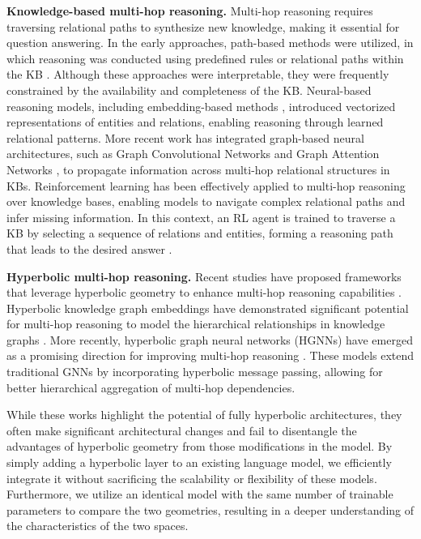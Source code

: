 \documentclass[11pt]{article}
\begin{document}
\textbf{Knowledge-based multi-hop reasoning.} Multi-hop reasoning requires traversing relational paths to synthesize new knowledge, making it essential for question answering. In the early approaches, path-based methods were utilized, in which reasoning was conducted using predefined rules or relational paths within the KB \cite{lao-etal-2011-random}.
Although these approaches were interpretable, they were frequently constrained by the availability and completeness of the KB. Neural-based reasoning models, including embedding-based methods \cite{bordes2013transe, wang2014knowledge, yang2015embedding, sunrotate}, introduced vectorized representations of entities and relations, enabling reasoning through learned relational patterns. More recent work has integrated graph-based neural architectures, such as Graph Convolutional Networks \cite{schlichtkrull2018modeling} and Graph Attention Networks \cite{velivckovic2018graph}, to propagate information across multi-hop relational structures in KBs. Reinforcement learning has been effectively applied to multi-hop reasoning over knowledge bases, enabling models to navigate complex relational paths and infer missing information. In this context, an RL agent is trained to traverse a KB by selecting a sequence of relations and entities, forming a reasoning path that leads to the desired answer \cite{ma2024pmhr, wan2021reasoning, lin-etal-2018-multi, zhu2022step}.

\noindent
\textbf{Hyperbolic multi-hop reasoning.} Recent studies have proposed frameworks that leverage hyperbolic geometry to enhance multi-hop reasoning capabilities \cite{zhou2021multi, xiao2022hyperbolic, wang2024hypermr}. Hyperbolic knowledge graph embeddings have demonstrated significant potential for multi-hop reasoning to model the hierarchical relationships in knowledge graphs \cite{chami2020lowdimensionalhyperbolicknowledgegraph, balažević2019multirelationalpoincaregraphembeddings, montella2021hyperbolictemporalknowledgegraph, kolyvakis2019hyperkg}. More recently, hyperbolic graph neural networks (HGNNs) have emerged as a promising direction for improving multi-hop reasoning \cite{liu2023hyperbolicgraphreasoning, liu2019hyperbolicgnn, chami2019hyperbolicgcnn}. These models extend traditional GNNs by incorporating hyperbolic message passing, allowing for better hierarchical aggregation of multi-hop dependencies. 

While these works highlight the potential of fully hyperbolic architectures, they often make significant architectural changes and fail to disentangle the advantages of hyperbolic geometry from those modifications in the model. By simply adding a hyperbolic layer to an existing language model, we efficiently integrate it without sacrificing the scalability or flexibility of these models. Furthermore, we utilize an identical model with the same number of trainable parameters to compare the two geometries, resulting in a deeper understanding of the characteristics of the two spaces.
\end{document}

